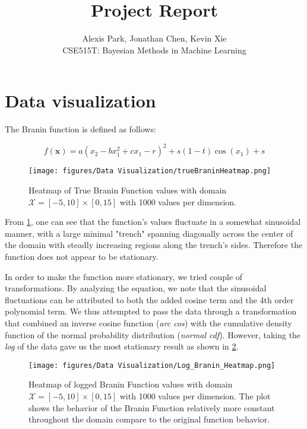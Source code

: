 \documentclass[11pt]{article}
\newcommand{\Course}{CSE515T: Bayesian Methods in Machine Learning}
\newcommand{\mc}[1]{\mathcal{#1}}
\numberwithin{equation}{section}
\begin{document}
\title{Project Report}
\author{Alexis Park, Jonathan Chen, Kevin Xie \\ \Course}
\maketitle

\section*{Data visualization}

The Branin function is defined as follows:

\begin{equation}
  f(\bm{x}) = a(x_2 - bx_1^2 + cx_1 - r)^2 + s(1 - t)\cos(x_1) + s
  \label{eq:branin}
\end{equation}

\begin{figure}[H]
  \centering
  \texttt{[image: figures/Data Visualization/trueBraninHeatmap.png]}
  \caption{Heatmap of True Branin Function values with domain $\mc{X} = [-5, 10] \times [0, 15]$  with 1000 values per dimension.}
  \label{fig:true_branin_heatmap}
\end{figure}

From \ref{fig:true_branin_heatmap}, one can see that the function's values fluctuate in a somewhat sinusoidal manner, with a large minimal "trench" spanning diagonally across the center of the domain with steadly increasing regions along the trench's sides. Therefore the function does not appear to be stationary.

In order to make the function more stationary, we tried couple of transformations. By analyzing the equation, we note that the sinusoidal fluctuations can be attributed to both the added cosine term and the 4th order polynomial term. We thus attempted to pass the data through a transformation that combined an inverse cosine function (\emph{arc cos}) with the cumulative density function of the normal probability distribution (\emph{normal cdf}). However, taking the \emph{log} of the data gave us the most stationary result as shown in \ref{fig:log_branin_heatmap}. 

\begin{figure}[H]
  \centering
  \texttt{[image: figures/Data Visualization/Log\_Branin\_Heatmap.png]}
  \caption{Heatmap of logged Branin Function values with domain $\mc{X} = [-5, 10] \times [0, 15]$  with 1000 values per dimension. The plot shows the behavior of the Branin Function relatively more constant throughout the domain compare to the original function behavior.}
  \label{fig:log_branin_heatmap}
\end{figure}
\end{document}
